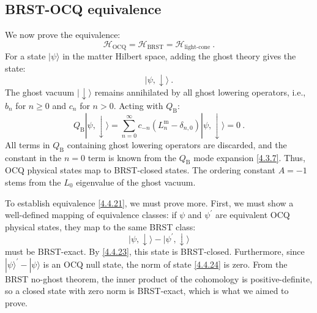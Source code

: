 \subsection*{BRST-OCQ equivalence}
We now prove the equivalence:
\begin{equation}
\mathscr{H}_{\mathrm{OCQ}}=\mathscr{H}_{\mathrm{BRST}}=\mathscr{H}_{\text {light-cone}} \:. \label{4.4.21}
\end{equation}
For a state $\lvert\psi\rangle$ in the matter Hilbert space, adding the ghost theory gives the state:
\begin{equation}
|\psi, \downarrow\rangle \:.\label{4.4.22}
\end{equation}
The ghost vacuum $\lvert\downarrow\rangle$ remains annihilated by all ghost lowering operators, i.e., $b_{n}$ for $n\geq 0$ and $c_{n}$ for $n>0$. Acting with $Q_{\mathrm{B}}$:
\begin{equation}
Q_{\mathrm{B}}|\psi, \downarrow\rangle=\sum_{n=0}^{\infty} c_{-n}(L_{n}^{\mathrm{m}}-\delta_{n, 0})|\psi, \downarrow\rangle=0 \:. \label{4.4.23}
\end{equation}
All terms in $Q_{\mathrm{B}}$ containing ghost lowering operators are discarded, and the constant in the $n=0$ term is known from the $Q_{\mathrm{B}}$ mode expansion \eqref{4.3.7}. Thus, OCQ physical states map to BRST-closed states. The ordering constant $A=-1$ stems from the $L_{0}$ eigenvalue of the ghost vacuum.

To establish equivalence \eqref{4.4.21}, we must prove more. First, we must show a well-defined mapping of equivalence classes: if $\psi$ and $\psi^{\prime}$ are equivalent OCQ physical states, they map to the same BRST class:
\begin{equation}
|\psi, \downarrow\rangle- |\psi^{\prime}, \downarrow\rangle \label{4.4.24}
\end{equation}
must be BRST-exact. By \eqref{4.4.23}, this state is BRST-closed. Furthermore, since $|\psi\rangle^{\prime}-|\psi\rangle$ is an OCQ null state, the norm of state \eqref{4.4.24} is zero. From the BRST no-ghost theorem, the inner product of the cohomology is positive-definite, so a closed state with zero norm is BRST-exact, which is what we aimed to prove.

